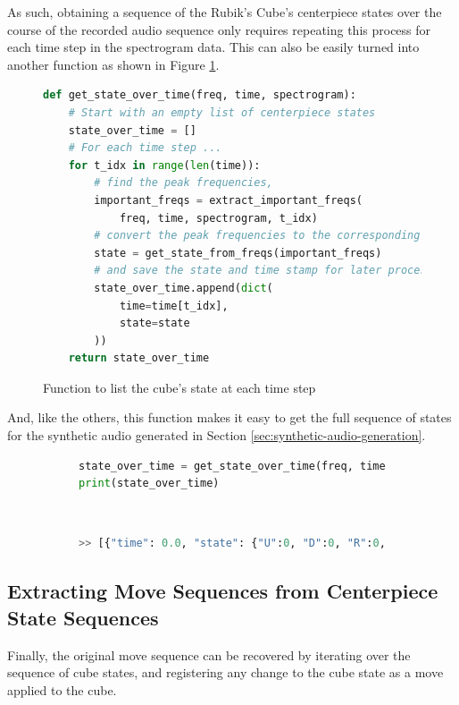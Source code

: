 As such, obtaining a sequence of the Rubik's Cube's centerpiece states over the course of the recorded audio sequence only requires repeating this process for each time step in the spectrogram data.
This can also be easily turned into another function as shown in Figure \ref{fig:code-get-state-over-time}.

\begin{figure}[h]
\caption{Function to list the cube's state at each time step}
\label{fig:code-get-state-over-time}
\begin{lstlisting}[language=Python]
def get_state_over_time(freq, time, spectrogram):
    # Start with an empty list of centerpiece states
    state_over_time = []
    # For each time step ...
    for t_idx in range(len(time)):
        # find the peak frequencies,
        important_freqs = extract_important_freqs(
            freq, time, spectrogram, t_idx)
        # convert the peak frequencies to the corresponding state,
        state = get_state_from_freqs(important_freqs)
        # and save the state and time stamp for later processing.
        state_over_time.append(dict(
            time=time[t_idx],
            state=state
        ))
    return state_over_time
\end{lstlisting}
\end{figure}

And, like the others, this function makes it easy to get the full sequence of states for the synthetic audio generated in Section \ref{sec:synthetic-audio-generation}.
\begin{figure}[h]
\caption{Example listing of states over time}
\label{fig:code-get-state-over-time-demo} 
\begin{subfigure}{\textwidth}
\begin{lstlisting}[language=Python]
state_over_time = get_state_over_time(freq, time, spectrogram)
print(state_over_time)
\end{lstlisting}
\end{subfigure}\\

\begin{subfigure}{\textwidth}
\begin{lstlisting}[language=Python, numbers=none]
>> [{"time": 0.0, "state": {"U":0, "D":0, "R":0, "L":0, "F":0, "B":0}}, ... ]
\end{lstlisting}
\end{subfigure}
\end{figure}

\newpage
\subsection{Extracting Move Sequences from Centerpiece State Sequences}
\label{subsec:extract-moves}
Finally, the original move sequence can be recovered by iterating over the sequence of cube states, and registering any change to the cube state as a move applied to the cube.

